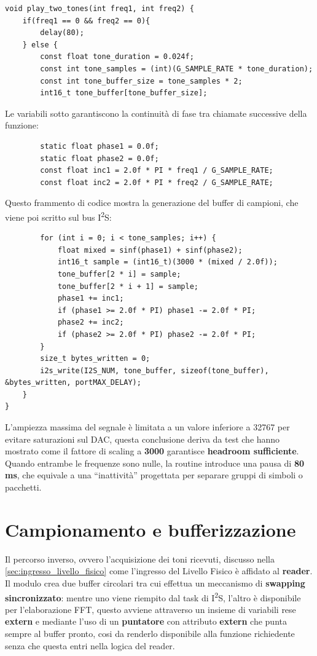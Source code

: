 \begin{verbatim}
void play_two_tones(int freq1, int freq2) {
    if(freq1 == 0 && freq2 == 0){
        delay(80);
    } else {
        const float tone_duration = 0.024f;
        const int tone_samples = (int)(G_SAMPLE_RATE * tone_duration);
        const int tone_buffer_size = tone_samples * 2;
        int16_t tone_buffer[tone_buffer_size];
    \end{verbatim}
Le variabili sotto garantiscono la continuità di fase tra chiamate successive della funzione:
\begin{verbatim}
        static float phase1 = 0.0f;
        static float phase2 = 0.0f;
        const float inc1 = 2.0f * PI * freq1 / G_SAMPLE_RATE;
        const float inc2 = 2.0f * PI * freq2 / G_SAMPLE_RATE;
    \end{verbatim}
Questo frammento di codice mostra la generazione del buffer di campioni,
 che viene poi scritto sul bus I\textsuperscript{2}S:
\begin{verbatim}
        for (int i = 0; i < tone_samples; i++) {
            float mixed = sinf(phase1) + sinf(phase2);
            int16_t sample = (int16_t)(3000 * (mixed / 2.0f));
            tone_buffer[2 * i] = sample;
            tone_buffer[2 * i + 1] = sample;
            phase1 += inc1;
            if (phase1 >= 2.0f * PI) phase1 -= 2.0f * PI;
            phase2 += inc2;
            if (phase2 >= 2.0f * PI) phase2 -= 2.0f * PI;
        }
        size_t bytes_written = 0;
        i2s_write(I2S_NUM, tone_buffer, sizeof(tone_buffer), &bytes_written, portMAX_DELAY);
    }
}
\end{verbatim}

L’ampiezza massima del segnale è limitata a un valore inferiore a 32767 per evitare saturazioni sul DAC, questa conclusione deriva
 da test che hanno mostrato come 
 il fattore di scaling a \textbf{3000} garantisce \textbf{headroom sufficiente}. Quando entrambe le frequenze sono nulle,
  la routine introduce una pausa di \textbf{80 ms}, che equivale a una “inattività” progettata per separare gruppi di
   simboli o pacchetti.

\section{Campionamento e bufferizzazione}

Il percorso inverso, ovvero l’acquisizione dei toni ricevuti, discusso nella \autoref{sec:ingresso_livello_fisico} come l'ingresso del Livello Fisico 
è affidato al \textbf{reader}.  \\ 
Il modulo crea due buffer circolari tra cui effettua un meccanismo di \textbf{swapping sincronizzato}: mentre uno viene riempito dal task di I\textsuperscript{2}S, 
l’altro è disponibile per l’elaborazione FFT, questo avviene attraverso un insieme di variabili rese \textbf{extern} e mediante l'uso di un \textbf{puntatore} 
con attributo \textbf{extern} che punta sempre al buffer pronto, cosi da renderlo disponibile alla funzione richiedente senza che questa entri nella 
logica del reader. \\

